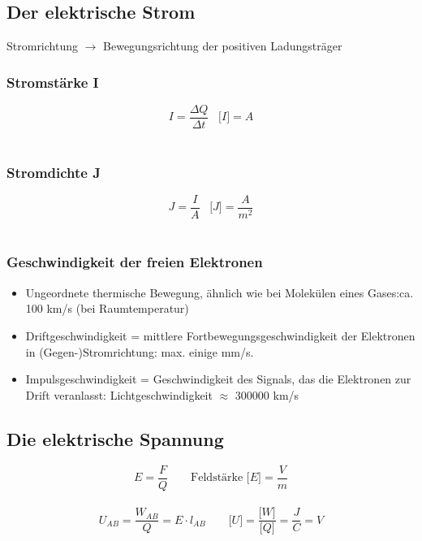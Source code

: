 \subsection{Der elektrische Strom}
Stromrichtung $\rightarrow$ Bewegungsrichtung der positiven Ladungsträger\\
\begin{multicols}{2}
	\subsubsection{Stromstärke I}
	$$ I=\frac{\Delta Q}{\Delta t} \hspace{10pt}  \lbrack I \rbrack = A $$\\
	\subsubsection{Stromdichte J}
	$$ J=\frac {I}{A}  \hspace{10pt}  \lbrack J \rbrack = \frac {A}{m^2} $$\\
\end{multicols}

\subsubsection{Geschwindigkeit der freien Elektronen}
\begin{itemize}
	\item Ungeordnete thermische Bewegung, ähnlich wie bei Molekülen eines Gases:ca. 100 km/s (bei Raumtemperatur)\\
	\item Driftgeschwindigkeit = mittlere Fortbewegungsgeschwindigkeit der Elektronen in  (Gegen-)Stromrichtung: max. einige mm/s.\\
	\item Impulsgeschwindigkeit = Geschwindigkeit des Signals, das die Elektronen zur Drift veranlasst: Lichtgeschwindigkeit $\approx$ 300000 km/s\\
\end{itemize}

\subsection{Die elektrische Spannung}

\begin{multicols}{2}
	$$E=\frac{F}{Q} \qquad \text{Feldstärke }\lbrack E \rbrack = \frac{V}{m}$$\\
	$$U_{AB} = \frac{W_{AB}}{Q} = E \cdot l_{AB} \qquad
	\lbrack U \rbrack = \frac{\lbrack W \rbrack}{\lbrack Q \rbrack} = \frac{J}{C} = V$$\\
\end{multicols}
	
